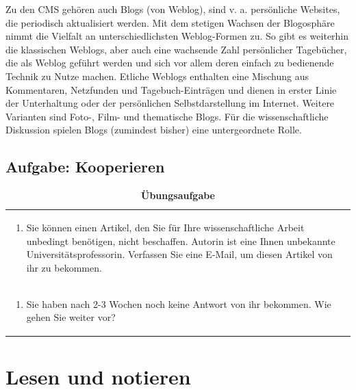 \documentclass[]{book}
\providecommand{\tightlist}{%
  \setlength{\itemsep}{0pt}\setlength{\parskip}{0pt}}
\theoremstyle{definition}
\theoremstyle{definition}
\theoremstyle{definition}
\theoremstyle{remark}
\begin{document}
Zu den CMS gehören auch Blogs (von Weblog), sind v. a. persönliche
Websites, die periodisch aktualisiert werden. Mit dem stetigen Wachsen
der Blogosphäre nimmt die Vielfalt an unterschiedlichsten Weblog-Formen
zu. So gibt es weiterhin die klassischen Weblogs, aber auch eine
wachsende Zahl persönlicher Tagebücher, die als Weblog geführt werden
und sich vor allem deren einfach zu bedienende Technik zu Nutze machen.
Etliche Weblogs enthalten eine Mischung aus Kommentaren, Netzfunden und
Tagebuch-Einträgen und dienen in erster Linie der Unterhaltung oder der
persönlichen Selbstdarstellung im Internet. Weitere Varianten sind
Foto-, Film- und thematische Blogs. Für die wissenschaftliche Diskussion
spielen Blogs (zumindest bisher) eine untergeordnete Rolle.

\section{Aufgabe: Kooperieren}\label{aufgabe-kooperieren}

\begin{longtable}[]{@{}l@{}}
\caption{\textbf{\label{tab:aufgabe4-test} Übungsaufgabe}}\tabularnewline
\toprule
\begin{minipage}[t]{0.97\columnwidth}\raggedright\strut
\begin{enumerate}
\def\labelenumi{\arabic{enumi}.}
\tightlist
\item
  Sie können einen Artikel, den Sie für Ihre wissenschaftliche Arbeit
  unbedingt benötigen, nicht beschaffen. Autorin ist eine Ihnen
  unbekannte Universitätsprofessorin. Verfassen Sie eine E-Mail, um
  diesen Artikel von ihr zu bekommen. \vspace{-6mm}
\end{enumerate}\strut
\end{minipage}\tabularnewline
\begin{minipage}[t]{0.97\columnwidth}\raggedright\strut
\begin{enumerate}
\def\labelenumi{\arabic{enumi}.}
\setcounter{enumi}{1}
\tightlist
\item
  Sie haben nach 2-3 Wochen noch keine Antwort von ihr bekommen. Wie
  gehen Sie weiter vor?
\end{enumerate}\strut
\end{minipage}\tabularnewline
\bottomrule
\end{longtable}

\chapter{Lesen und notieren}\label{lesen-und-notieren}
\end{document}
